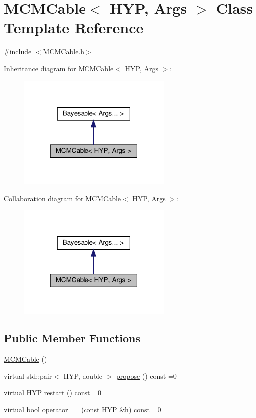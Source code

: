 \hypertarget{class_m_c_m_cable}{}\section{M\+C\+M\+Cable$<$ H\+YP, Args $>$ Class Template Reference}
\label{class_m_c_m_cable}


{\ttfamily \#include $<$M\+C\+M\+Cable.\+h$>$}



Inheritance diagram for M\+C\+M\+Cable$<$ H\+YP, Args $>$\+:
\nopagebreak
\begin{figure}[H]
\begin{center}
\leavevmode
\includegraphics[width=211pt]{class_m_c_m_cable__inherit__graph}
\end{center}
\end{figure}


Collaboration diagram for M\+C\+M\+Cable$<$ H\+YP, Args $>$\+:
\nopagebreak
\begin{figure}[H]
\begin{center}
\leavevmode
\includegraphics[width=211pt]{class_m_c_m_cable__coll__graph}
\end{center}
\end{figure}
\subsection*{Public Member Functions}
\begin{DoxyCompactItemize}
\item 
\hyperlink{class_m_c_m_cable_aac715433bffb674dd5809e7c1bc59ae5}{M\+C\+M\+Cable} ()
\item 
virtual std\+::pair$<$ H\+YP, double $>$ \hyperlink{class_m_c_m_cable_ab119a14256ab92c5c1e941f8492df830}{propose} () const =0
\item 
virtual H\+YP \hyperlink{class_m_c_m_cable_a220d6c4ca73e20441c14fa5bd3e090d3}{restart} () const =0
\item 
virtual bool \hyperlink{class_m_c_m_cable_aa73001ec3bb0cf0c618281dfa998f2f1}{operator==} (const H\+YP \&h) const =0
\end{DoxyCompactItemize}
